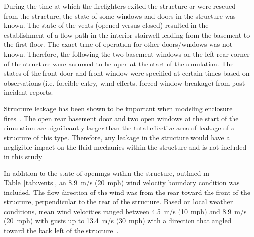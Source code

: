 \documentclass[12pt,oneside]{book}
\begin{document}
During the time at which the firefighters exited the structure or were rescued from the structure, the state of some windows and doors in the structure was known. The state of the vents (opened versus closed) resulted in the establishment of a flow path in the interior stairwell leading from the basement to the first floor. The exact time of operation for other doors/windows was not known. Therefore, the following the two basement windows on the left rear corner of the structure were assumed to be open at the start of the simulation. The states of the front door and front window were specified at certain times based on observations (i.e. forcible entry, wind effects, forced window breakage) from post-incident reports.

Structure leakage has been shown to be important when modeling enclosure fires~\cite{beal2009}. The open rear basement door and two open windows at the start of the simulation are significantly larger than the total effective area of leakage of a structure of this type. Therefore, any leakage in the structure would have a negligible impact on the fluid mechanics within the structure and is not included in this study.

In addition to the state of openings within the structure, outlined in Table~\ref{tab:vents}, an 8.9~m/s (20~mph) wind velocity boundary condition was included. The flow direction of the wind was from the rear toward the front of the structure, perpendicular to the rear of the structure.  Based on local weather conditions, mean wind velocities ranged between 4.5~m/s (10~mph) and 8.9~m/s (20~mph) with gusts up to 13.4~m/s (30~mph) with a direction that angled toward the back left of the structure~\cite{PGCounty2013}.
\end{document}

